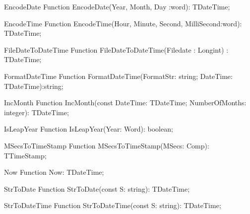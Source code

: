  
\begin{function}{EncodeDate}
\Declaration
Function EncodeDate(Year, Month, Day :word): TDateTime;
\Description
\Errors
\SeeAlso
\end{function}

 
\begin{function}{EncodeTime}
\Declaration
Function EncodeTime(Hour, Minute, Second, MilliSecond:word): TDateTime;
\Description
\Errors
\SeeAlso
\end{function}

 
\begin{function}{FileDateToDateTime}
\Declaration
Function FileDateToDateTime(Filedate : Longint) : TDateTime;
\Description
\Errors
\SeeAlso
\end{function}

 
\begin{function}{FormatDateTime}
\Declaration
Function FormatDateTime(FormatStr: string; DateTime: TDateTime):string;
\Description
\Errors
\SeeAlso
\end{function}

 
\begin{function}{IncMonth}
\Declaration
Function IncMonth(const DateTime: TDateTime; NumberOfMonths: integer): TDateTime;
\Description
\Errors
\SeeAlso
\end{function}

 
\begin{function}{IsLeapYear}
\Declaration
Function IsLeapYear(Year: Word): boolean;
\Description
\Errors
\SeeAlso
\end{function}

 
\begin{function}{MSecsToTimeStamp}
\Declaration
Function MSecsToTimeStamp(MSecs: Comp): TTimeStamp;
\Description
\Errors
\SeeAlso
\end{function}

 
\begin{function}{Now}
\Declaration
Function Now: TDateTime;
\Description
\Errors
\SeeAlso
\end{function}

 
\begin{function}{StrToDate}
\Declaration
Function StrToDate(const S: string): TDateTime;
\Description
\Errors
\SeeAlso
\end{function}

 
\begin{function}{StrToDateTime}
\Declaration
Function StrToDateTime(const S: string): TDateTime;
\Description
\Errors
\SeeAlso
\end{function}

